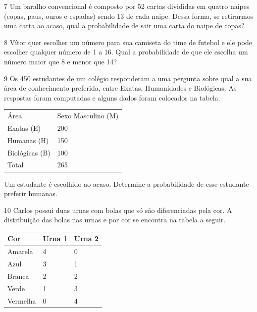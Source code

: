 \num{7} Um baralho convencional é composto por 52 cartas divididas em quatro
naipes (copas, paus, ouros e espadas) sendo 13 de cada naipe. Dessa
forma, se retirarmos uma carta ao acaso, qual a probabilidade de sair
uma carta do naipe de copas?




\num{8} Vítor quer escolher um número para sua camiseta do time de futebol e ele
pode escolher qualquer número de 1 a 16. Qual a probabilidade de que ele
escolha um número maior que 8 e menor que 14?




\num{9} Os 450 estudantes de um colégio responderam a uma pergunta sobre qual a
sua área de conhecimento preferida, entre Exatas, Humanidades e
Biológicas. As respostas foram computadas e alguns dados foram colocados
na tabela.

\begin{longtable}[]{@{}ll@{}}
\toprule
Área & Sexo Masculino (M)\tabularnewline
Exatas (E) & 200\tabularnewline
Humanas (H) & 150\tabularnewline
Biológicas (B) & 100\tabularnewline
Total & 265\tabularnewline
\bottomrule
\end{longtable}

Um estudante é escolhido ao acaso. Determine a probabilidade de esse
estudante preferir humanas.





\num{10} Carlos possui duas urnas com bolas que só são diferenciadas pela cor. A
distribuição das bolas nas urnas e por cor se encontra na tabela a
seguir.

\begin{longtable}[]{@{}lll@{}}
\toprule
Cor & Urna 1 & Urna 2\tabularnewline
\midrule
\endhead
Amarela & 4 & 0\tabularnewline
Azul & 3 & 1\tabularnewline
Branca & 2 & 2\tabularnewline
Verde & 1 & 3\tabularnewline
Vermelha & 0 & 4\tabularnewline
\bottomrule
\end{longtable}

